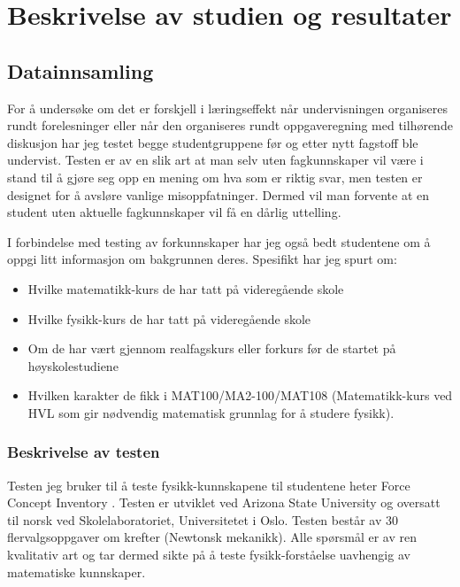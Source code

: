 \documentclass[a4paper,norsk,12pt]{article}
\begin{document}
\section{Beskrivelse av studien og resultater}
\subsection{Datainnsamling}
For å undersøke om det er forskjell i læringseffekt når undervisningen organiseres rundt forelesninger eller når den organiseres rundt oppgaveregning med tilhørende diskusjon har jeg testet begge studentgruppene før og etter nytt fagstoff ble undervist. Testen er av en slik art at man selv uten fagkunnskaper vil være i stand til å gjøre seg opp en mening om hva som er riktig svar, men testen er designet for å avsløre vanlige misoppfatninger. Dermed vil man forvente at en student uten aktuelle fagkunnskaper vil få en dårlig uttelling.

I forbindelse med testing av forkunnskaper har jeg også bedt studentene om å oppgi litt informasjon om bakgrunnen deres. Spesifikt har jeg spurt om:
\begin{itemize}
\item
	Hvilke matematikk-kurs de har tatt på videregående skole
\item
	Hvilke fysikk-kurs de har tatt på videregående skole
\item
	Om de har vært gjennom realfagskurs eller forkurs før de startet på høyskolestudiene
\item
	Hvilken karakter de fikk i MAT100/MA2-100/MAT108 (Matematikk-kurs ved HVL som gir nødvendig matematisk grunnlag for å studere fysikk).
\end{itemize}

\subsubsection{Beskrivelse av testen}
Testen jeg bruker til å teste fysikk-kunnskapene til studentene heter Force Concept Inventory \cite{1992FCI}. Testen er utviklet ved Arizona State University og oversatt til norsk ved Skolelaboratoriet, Universitetet i Oslo. Testen består av 30 flervalgsoppgaver om krefter (Newtonsk mekanikk). Alle spørsmål er av ren kvalitativ art og tar dermed sikte på å teste fysikk-forståelse uavhengig av matematiske kunnskaper. 
\end{document}
